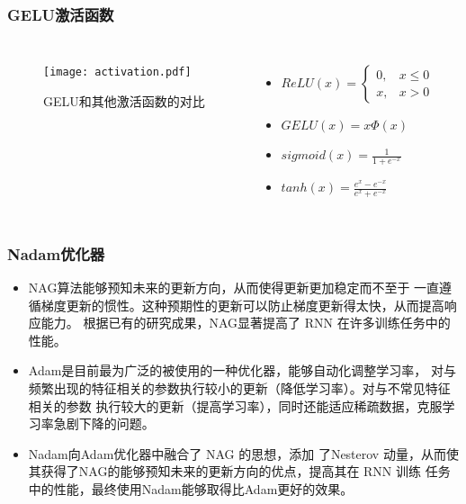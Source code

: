 \documentclass[14pt, AutoFakeBold]{ppt}
\begin{document}
\begin{frame}
  \frametitle{GELU激活函数}
  \begin{columns}
    \begin{figure}[H]
      \centering
      \texttt{[image: activation.pdf]}
      \caption{GELU和其他激活函数的对比}
      \label{fig_activation}
    \end{figure}
      \begin{itemize}
      \item $ReLU(x)=\left\{\begin{matrix}
          0, & x \leq 0 \\
          x, & x > 0
      \end{matrix}\right.$
      \item $GELU(x)=x\Phi(x)$
      \item $sigmoid(x)=\frac{1}{1+e^{-x}}$
      \item $tanh(x)=\frac{e^x-e^{-x}}{e^x+e^{-x}}$
    \end{itemize}
  \end{columns}
\end{frame}

\begin{frame}
  \frametitle{Nadam优化器}
  \begin{itemize}
    \item NAG算法能够预知未来的更新方向，从而使得更新更加稳定而不至于
一直遵循梯度更新的惯性。这种预期性的更新可以防止梯度更新得太快，从而提高响应能力。
根据已有的研究成果，NAG显著提高了 RNN 在许多训练任务中的性能。
    \item Adam是目前最为广泛的被使用的一种优化器，能够自动化调整学习率，
对与频繁出现的特征相关的参数执行较小的更新（降低学习率）。对与不常见特征相关的参数
执行较大的更新（提高学习率），同时还能适应稀疏数据，克服学习率急剧下降的问题。
    \item Nadam向Adam优化器中融合了 NAG 的思想，添加
了Nesterov 动量，从而使其获得了NAG的能够预知未来的更新方向的优点，提高其在 RNN 训练
任务中的性能，最终使用Nadam能够取得比Adam更好的效果。
\end{itemize}
\end{frame}
\end{document}
